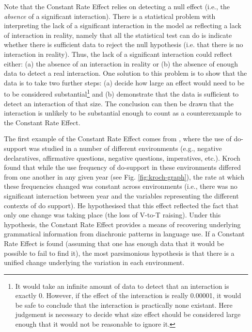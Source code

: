 	Note that the Constant Rate Effect relies on detecting a null effect (i.e., the \textit{absence} of a significant interaction). There is a statistical problem with interpreting the lack of a significant interaction in the model as reflecting a lack of interaction in reality, namely that all the statistical test can do is indicate whether there is sufficient data to reject the null hypothesis (i.e. that there is no interaction in reality). Thus, the lack of a significant interaction could reflect either: (a) the absence of an interaction in reality or (b) the absence of enough data to detect a real interaction. One solution to this problem is to show that the data is to take two further steps: (a) decide how large an effect would need to be to be considered substantial\footnote{It would take an infinite amount of data to detect that an interaction is exactly 0. However, if the effect of the interaction is really 0.00001, it would be safe to conclude that the interaction is practically none existant. Here judgement is necessary to decide what size effect should be considered large enough that it would not be reasonable to ignore it.} and (b) demonstrate that the data is sufficient to detect an interaction of that size. The conclusion can then be drawn that the interaction is unlikely to be substantial enough to count as a counterexample to the Constant Rate Effect.

	The first example of the Constant Rate Effect comes from \cite{Kroch.1989}, where the use of do-support was studied in a number of different environments (e.g., negative declaratives, affirmative questions, negative questions, imperatives, etc.). Kroch found that while the use frequency of do-support in these environments differed from one another in any given year (see Fig. \ref{fig:kroch-graph}), the rate at which these frequencies changed was constant across environments (i.e., there was no significant interaction between year and the variables representing the different contexts of do support). He hypothesised that this effect reflected the fact that only one change was taking place (the loss of V-to-T raising). Under this hypothesis, the Constant Rate Effect provides a means of recovering underlying grammatical information from diachronic patterns in language use. If a Constant Rate Effect is found (assuming that one has enough data that it would be possible to fail to find it), the most parsimonious hypothesis is that there is a unified change underlying the variation in each environment.

